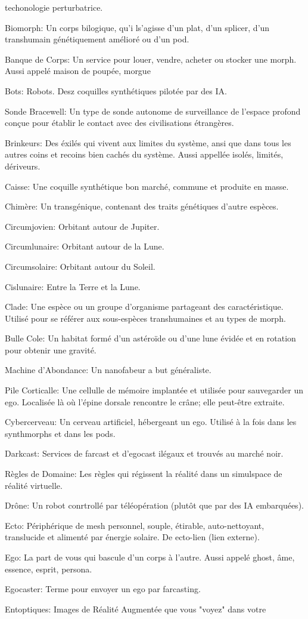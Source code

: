 techonologie perturbatrice. \item Biomorph: Un corps bilogique, qu'i ls'agisse d'un plat, d'un splicer, d'un transhumain génétiquement amélioré ou d'un pod. \item Banque de Corps: Un service pour louer, vendre, acheter  ou stocker une morph. Aussi appelé maison de poupée, morgue \item Bots: Robots. Desz coquilles synthétiques pilotée par des IA. \item Sonde Bracewell: Un type de sonde autonome de surveillance de l'espace profond conçue pour établir le contact avec des civilisations étrangères. \item Brinkeurs: Des éxilés qui vivent aux limites du système, ansi que dans tous les autres coins et recoins bien cachés du système. Aussi appellée isolés, limités, dériveurs. \item Caisse: Une coquille synthétique bon marché, commune et produite en masse. \item Chimère: Un transgénique, contenant des traits génétiques d'autre espèces. \item Circumjovien: Orbitant autour de Jupiter. \item Circumlunaire: Orbitant autour de la Lune. \item Circumsolaire: Orbitant autour du Soleil. \item Cislunaire: Entre la Terre et la Lune. \item Clade: Une espèce ou un groupe d'organisme partageant des caractéristique. Utilisé pour se référer aux sous-espèces transhumaines et au types de morph. \item Bulle Cole: Un habitat formé d'un astéroïde ou d'une lune évidée et en rotation pour obtenir une gravité. \item Machine d'Abondance: Un nanofabeur a but généraliste. \item Pile Corticalle: Une cellulle de mémoire implantée et utilisée pour sauvegarder un ego. Localisée là où l'épine dorsale rencontre le crâne; elle peut-être extraite. \item Cybercerveau: Un cerveau artificiel, hébergeant un ego. Utilisé à la fois dans les synthmorphs et dans les pods. \item Darkcast: Services de farcast et d'egocast ilégaux et trouvés au marché noir. \item Règles de Domaine: Les règles qui régissent la réalité dans un simulspace de réalité virtuelle. \item Drône: Un robot conrtrollé par téléopération (plutôt que par des IA embarquées). \item Ecto: Périphérique de mesh personnel, souple, étirable, auto-nettoyant, translucide et alimenté par énergie solaire. De ecto-lien (lien externe). \item Ego: La part de vous qui bascule d'un corps à l'autre. Aussi appelé ghost, âme, essence, esprit, persona. \item Egocaster: Terme pour envoyer un ego par farcasting. \item Entoptiques: Images de Réalité Augmentée que vous "voyez" dans votre 